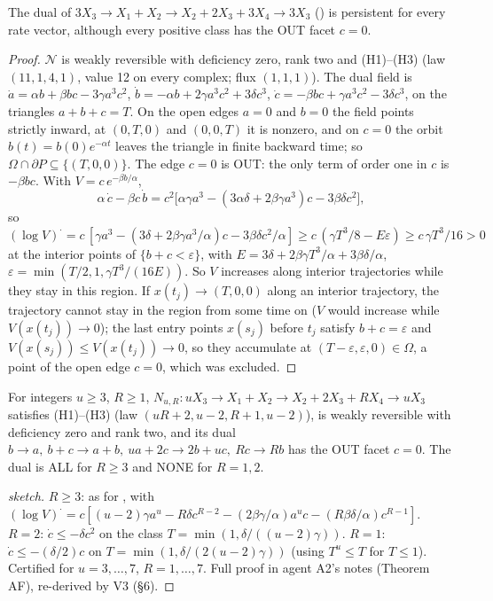 \documentclass[11pt,a4paper]{report}
\newcommand{\Net}{\mathcal{N}}
\begin{document}
\begin{theorem}[agent A2]\label{thm:A}
The dual of \(3X_3\to X_1+X_2\to X_2+2X_3+3X_4\to3X_3\) () is persistent for every rate vector, although
every positive class has the OUT facet \(c=0\).
\end{theorem}
\begin{proof}
\(\Net\) is weakly reversible with deficiency zero, rank two and (H1)--(H3) (law \((11,1,4,1)\), value 12 on every complex;
flux \((1,1,1)\)). The dual field is \(\dot a=\alpha b+\beta bc-3\gamma a^3c^2\), \(\dot b=-\alpha b+2\gamma a^3c^2+3\delta c^3\),
\(\dot c=-\beta bc+\gamma a^3c^2-3\delta c^3\), on the triangles \(a+b+c=T\). On the open edges \(a=0\) and \(b=0\) the
field points strictly inward, at \((0,T,0)\) and \((0,0,T)\) it is nonzero, and on \(c=0\) the orbit \(b(t)=b(0)e^{-\alpha t}\)
leaves the triangle in finite backward time; so \(\Omega\cap\partial P\subseteq\{(T,0,0)\}\). The edge \(c=0\) is OUT: the only
term of order one in \(c\) is \(-\beta bc\). With \(V=c\,e^{-\beta b/\alpha}\),
\begin{equation}\label{eq:A1}
\alpha\,\dot c-\beta c\,\dot b=c^2\bigl[\alpha\gamma a^3-(3\alpha\delta+2\beta\gamma a^3)c-3\beta\delta c^2\bigr],
\end{equation}
so \((\log V)^\cdot=c\,[\gamma a^3-(3\delta+2\beta\gamma a^3/\alpha)c-3\beta\delta c^2/\alpha]\ge c\,(\gamma T^3/8-E\varepsilon)
\ge c\,\gamma T^3/16>0\) at the interior points of \(\{b+c<\varepsilon\}\), with
\(E=3\delta+2\beta\gamma T^3/\alpha+3\beta\delta/\alpha\), \(\varepsilon=\min(T/2,1,\gamma T^3/(16E))\). So \(V\) increases
along interior trajectories while they stay in this region. If \(x(t_j)\to(T,0,0)\) along an interior trajectory, the
trajectory cannot stay in the region from some time on (\(V\) would increase while \(V(x(t_j))\to0\)); the last entry
points \(x(s_j)\) before \(t_j\) satisfy \(b+c=\varepsilon\) and \(V(x(s_j))\le V(x(t_j))\to0\), so they accumulate at
\((T-\varepsilon,\varepsilon,0)\in\Omega\), a point of the open edge \(c=0\), which was excluded.
\end{proof}

\begin{theorem}[agent A2]\label{thm:AF}
For integers \(u\ge3\), \(R\ge1\), \(N_{u,R}\colon uX_3\to X_1+X_2\to X_2+2X_3+RX_4\to uX_3\) satisfies (H1)--(H3) (law
\((uR+2,u-2,R+1,u-2)\)), is weakly reversible with deficiency zero and rank two, and its dual
\(b\to a,\ b+c\to a+b,\ ua+2c\to2b+uc,\ Rc\to Rb\) has the OUT facet \(c=0\). The dual is ALL for \(R\ge3\) and NONE for
\(R=1,2\).
\end{theorem}
\begin{proof}[sketch]
\(R\ge3\): as for , with \((\log V)^\cdot=c[(u-2)\gamma a^u-R\delta c^{R-2}-(2\beta\gamma/\alpha)a^uc-(R\beta\delta/\alpha)
c^{R-1}]\). \(R=2\): \(\dot c\le-\delta c^2\) on the class \(T=\min(1,\delta/((u-2)\gamma))\). \(R=1\): \(\dot c\le-(\delta/2)c\) on
\(T=\min(1,\delta/(2(u-2)\gamma))\) (using \(T^u\le T\) for \(T\le1\)). Certified for \(u=3,\dots,7\), \(R=1,\dots,7\).
Full proof in agent A2's notes (Theorem AF), re-derived by V3 (§6).
\end{proof}
\end{document}
